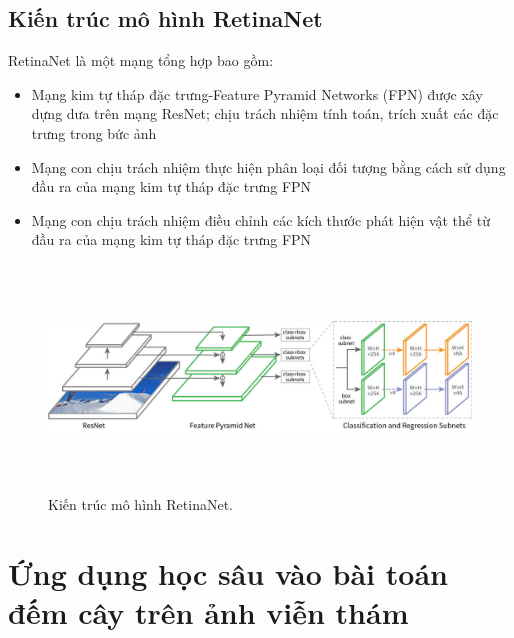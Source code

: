 \documentclass[a4paper, 12pt]{report}
\begin{document}
\section{Kiến trúc mô hình RetinaNet}
RetinaNet là một mạng tổng hợp bao gồm:
\begin{itemize}
	\item Mạng kim tự tháp đặc trưng-Feature Pyramid Networks (FPN) được xây dựng dưa trên mạng ResNet; chịu trách nhiệm tính toán,  trích xuất các đặc trưng trong bức ảnh
	\item Mạng con chịu trách nhiệm thực hiện phân loại đối tượng bằng cách sử dụng đầu ra của mạng kim tự tháp đặc trưng FPN
	\item Mạng con chịu trách nhiệm điều chỉnh các kích thước phát hiện vật thể từ đầu ra của mạng kim tự tháp đặc trưng FPN
\end{itemize}
\begin{figure}[!h]
	\centering
	\includegraphics[width=12cm,height=6cm]{Images/resnet_visulize}
	\caption{Kiến trúc mô hình RetinaNet.}
	\label{fig:resnet-fpn4}
\end{figure}
\chapter{Ứng dụng học sâu vào bài toán đếm cây trên ảnh viễn thám}
\end{document}
